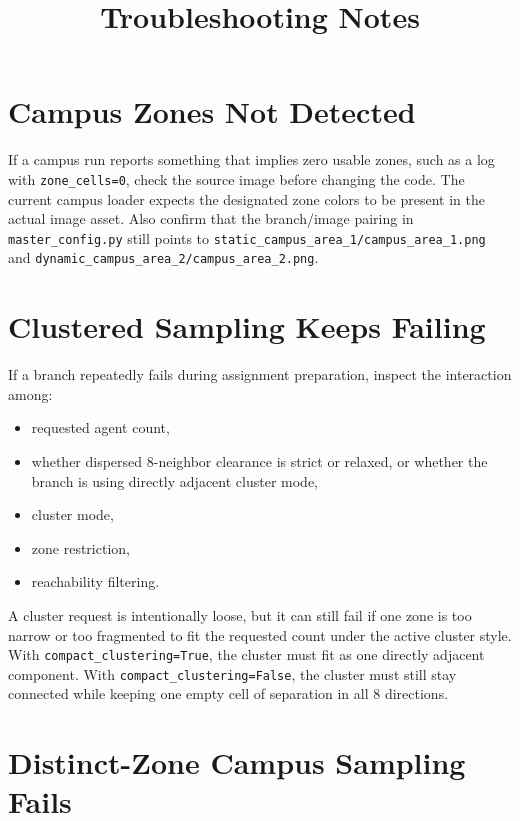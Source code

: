 \documentclass[11pt]{article}
\title{Troubleshooting Notes}
\author{}
\date{}
\begin{document}
\maketitle

\section{Campus Zones Not Detected}

If a campus run reports something that implies zero usable zones, such as a log with \texttt{zone\_cells=0}, check the source image before changing the code. The current campus loader expects the designated zone colors to be present in the actual image asset. Also confirm that the branch/image pairing in \texttt{master\_config.py} still points to \texttt{static\_campus\_area\_1/campus\_area\_1.png} and \texttt{dynamic\_campus\_area\_2/campus\_area\_2.png}.

\section{Clustered Sampling Keeps Failing}

If a branch repeatedly fails during assignment preparation, inspect the interaction among:
\begin{itemize}[leftmargin=2em]
    \item requested agent count,
    \item whether dispersed 8-neighbor clearance is strict or relaxed, or whether the branch is using directly adjacent cluster mode,
    \item cluster mode,
    \item zone restriction,
    \item reachability filtering.
\end{itemize}

A cluster request is intentionally loose, but it can still fail if one zone is too narrow or too fragmented to fit the requested count under the active cluster style. With \texttt{compact\_clustering=True}, the cluster must fit as one directly adjacent component. With \texttt{compact\_clustering=False}, the cluster must still stay connected while keeping one empty cell of separation in all 8 directions.

\section{Distinct-Zone Campus Sampling Fails}
\end{document}
